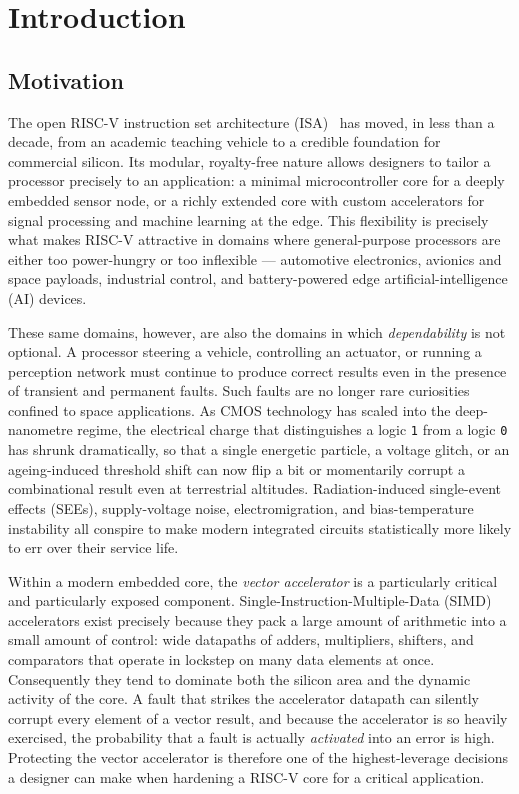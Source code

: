 \chapter{Introduction}
\label{ch:intro}

\section{Motivation}

The open RISC-V instruction set architecture (ISA)~\cite{riscv-isa} has moved, in less than a
decade, from an academic teaching vehicle to a credible foundation for
commercial silicon. Its modular, royalty-free nature allows designers to tailor
a processor precisely to an application: a minimal microcontroller core for a
deeply embedded sensor node, or a richly extended core with custom accelerators
for signal processing and machine learning at the edge. This flexibility is
precisely what makes RISC-V attractive in domains where general-purpose
processors are either too power-hungry or too inflexible --- automotive
electronics, avionics and space payloads, industrial control, and battery-powered
edge artificial-intelligence (AI) devices.

These same domains, however, are also the domains in which \emph{dependability}
is not optional. A processor steering a vehicle, controlling an actuator, or
running a perception network must continue to produce correct results even in
the presence of transient and permanent faults. Such faults are no longer rare
curiosities confined to space applications. As CMOS technology has scaled into
the deep-nanometre regime, the electrical charge that distinguishes a logic
\texttt{1} from a logic \texttt{0} has shrunk dramatically, so that a single
energetic particle, a voltage glitch, or an ageing-induced threshold shift can
now flip a bit or momentarily corrupt a combinational result even at terrestrial
altitudes. Radiation-induced single-event effects (SEEs), supply-voltage noise,
electromigration, and bias-temperature instability all conspire to make modern
integrated circuits statistically more likely to err over their service life.

Within a modern embedded core, the \emph{vector accelerator} is a particularly
critical and particularly exposed component. Single-Instruction-Multiple-Data
(SIMD) accelerators exist precisely because they pack a large amount of
arithmetic into a small amount of control: wide datapaths of adders,
multipliers, shifters, and comparators that operate in lockstep on many data
elements at once. Consequently they tend to dominate both the silicon area and
the dynamic activity of the core. A fault that strikes the accelerator datapath
can silently corrupt every element of a vector result, and because the
accelerator is so heavily exercised, the probability that a fault is actually
\emph{activated} into an error is high. Protecting the vector accelerator is
therefore one of the highest-leverage decisions a designer can make when
hardening a RISC-V core for a critical application.

